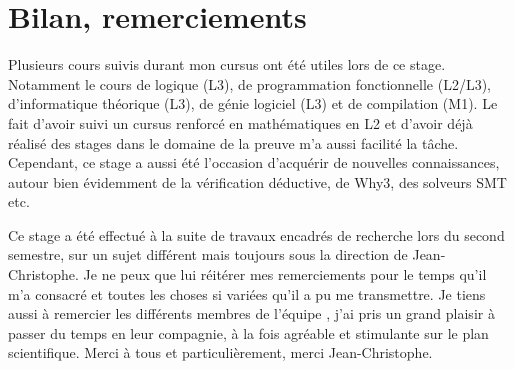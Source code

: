 \section{Bilan, remerciements}

  Plusieurs cours suivis durant mon cursus ont été utiles lors de ce stage. Notamment le cours de logique (L3), de programmation fonctionnelle (L2/L3), d'informatique théorique (L3), de génie logiciel (L3) et de compilation (M1). Le fait d'avoir suivi un cursus renforcé en mathématiques en L2 et d'avoir déjà réalisé des stages dans le domaine de la preuve m'a aussi facilité la tâche. Cependant, ce stage a aussi été l'occasion d'acquérir de nouvelles connaissances, autour bien évidemment de la vérification déductive, de Why3, des solveurs SMT etc.

  Ce stage a été effectué à la suite de travaux encadrés de recherche lors du second semestre, sur un sujet différent mais toujours sous la direction de Jean-Christophe. Je ne peux que lui réitérer mes remerciements pour le temps qu'il m'a consacré et toutes les choses si variées qu'il a pu me transmettre. Je tiens aussi à remercier les différents membres de l'équipe , j'ai pris un grand plaisir à passer du temps en leur compagnie, à la fois agréable et stimulante sur le plan scientifique. Merci à tous et particulièrement, merci Jean-Christophe.
